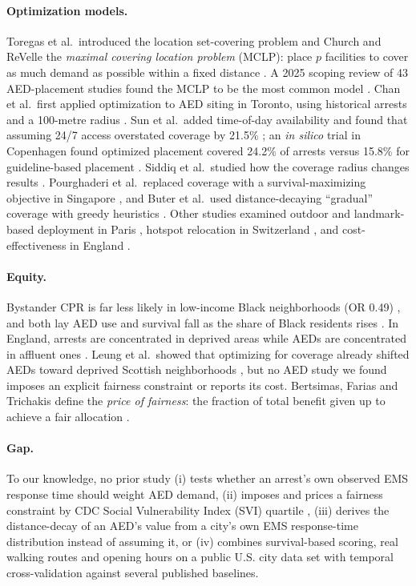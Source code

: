 \documentclass[11pt]{article}
\begin{document}
\paragraph{Optimization models.} Toregas et al.\ introduced the location set-covering problem \cite{toregas1971} and Church and ReVelle the \emph{maximal covering location problem} (MCLP): place $p$ facilities to cover as much demand as possible within a fixed distance \cite{church1974}. A 2025 scoping review of 43 AED-placement studies found the MCLP to be the most common model \cite{petravic2025}. Chan et al.\ first applied optimization to AED siting in Toronto, using historical arrests and a 100-metre radius \cite{chan2013,chan2016}. Sun et al.\ added time-of-day availability and found that assuming 24/7 access overstated coverage by 21.5\% \cite{sun2016}; an \emph{in silico} trial in Copenhagen found optimized placement covered 24.2\% of arrests versus 15.8\% for guideline-based placement \cite{sun2020}. Siddiq et al.\ studied how the coverage radius changes results \cite{siddiq2013}. Pourghaderi et al.\ replaced coverage with a survival-maximizing objective in Singapore \cite{pourghaderi2021}, and Buter et al.\ used distance-decaying ``gradual'' coverage with greedy heuristics \cite{buter2024}. Other studies examined outdoor and landmark-based deployment in Paris \cite{dahan2016}, hotspot relocation in Switzerland \cite{aeby2021}, and cost-effectiveness in England \cite{brown2025}.

\paragraph{Equity.} Bystander CPR is far less likely in low-income Black neighborhoods (OR 0.49) \cite{sasson2012}, and both lay AED use and survival fall as the share of Black residents rises \cite{starks2017}. In England, arrests are concentrated in deprived areas while AEDs are concentrated in affluent ones \cite{brown2025}. Leung et al.\ showed that optimizing for coverage already shifted AEDs toward deprived Scottish neighborhoods \cite{leung2021}, but no AED study we found imposes an explicit fairness constraint or reports its cost. Bertsimas, Farias and Trichakis define the \emph{price of fairness}: the fraction of total benefit given up to achieve a fair allocation \cite{bertsimas2011}.

\paragraph{Gap.} To our knowledge, no prior study (i) tests whether an arrest's own observed EMS response time should weight AED demand, (ii) imposes and prices a fairness constraint by CDC Social Vulnerability Index (SVI) quartile \cite{flanagan2011}, (iii) derives the distance-decay of an AED's value from a city's own EMS response-time distribution instead of assuming it, or (iv) combines survival-based scoring, real walking routes and opening hours on a public U.S. city data set with temporal cross-validation against several published baselines.
\end{document}
